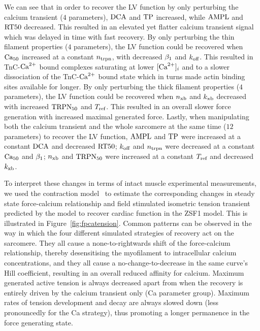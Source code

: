 \vspace{0.2cm}
We can see that in order to recover the LV function by only perturbing the calcium transient ($4$ parameters), $\textrm{DCA}$ and $\textrm{TP}$ increased, while $\textrm{AMPL}$ and $\textrm{RT50}$ decreased. This resulted in an elevated yet flatter calcium transient signal which was delayed in time with fast recovery. By only perturbing the thin filament properties ($4$ parameters), the LV function could be recovered when $\textrm{Ca}_{50}$ increased at a constant $n_{\textrm{trpn}}$, with decreased $\beta_1$ and $k_{\textrm{off}}$. This resulted in TnC-$\textrm{Ca}^{2+}$ bound complexes saturating at lower $[\textrm{Ca}^{2+}]_{i}$ and to a slower dissociation of the TnC-$\textrm{Ca}^{2+}$ bound state which in turns made actin binding sites available for longer. By only perturbing the thick filament properties ($4$ parameters), the LV function could be recovered when $n_{\textrm{xb}}$ and $k_{\textrm{xb}}$ decreased with increased $\textrm{TRPN}_{50}$ and $T_{\textrm{ref}}$. This resulted in an overall slower force generation with increased maximal generated force. Lastly, when manipulating both the calcium transient and the whole sarcomere at the same time ($12$ parameters) to recover the LV function, $\textrm{AMPL}$ and $\textrm{TP}$ were increased at a constant $\textrm{DCA}$ and decreased $\textrm{RT50}$; $k_{\textrm{off}}$ and $n_{\textrm{trpn}}$ were decreased at a constant $\textrm{Ca}_{50}$ and $\beta_1$; $n_{\textrm{xb}}$ and $\textrm{TRPN}_{50}$ were increased at a constant $T_{\textrm{ref}}$ and decreased $k_{\textrm{xb}}$.

\vspace{0.2cm}
To interpret these changes in terms of intact muscle experimental measurements, we used the contraction model~\cite{Land:2012*a} to estimate the corresponding changes in steady state force-calcium relationship and field stimulated isometric tension transient predicted by the model to recover cardiac function in the ZSF1 model. This is illustrated in Figure~\ref{fig:fpcatension}. Common patterns can be observed in the way in which the four different simulated strategies of recovery act on the sarcomere. They all cause a none-to-rightwards shift of the force-calcium relationship, thereby desensitising the myofilament to intracellular calcium concentrations, and they all cause a no-change-to-decrease in the same curve's Hill coefficient, resulting in an overall reduced affinity for calcium. Maximum generated active tension is always decreased apart from when the recovery is entirely driven by the calcium transient only (Ca parameter group). Maximum rates of tension development and decay are always slowed down (less pronouncedly for the Ca strategy), thus promoting a longer permanence in the force generating state. 

